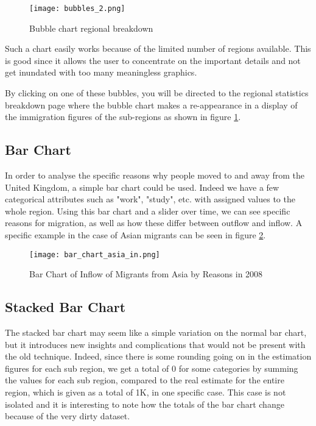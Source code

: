 \documentclass[11pt,a4paper,titlepage]{article}
\begin{document}
\begin{figure}[ht]
	\caption{Bubble chart regional breakdown}\label{fig_2}
	\centering
	\texttt{[image: bubbles\_2.png]}
\end{figure}

Such a chart easily works because of the limited number of regions available. This is good since it allows the user to concentrate on the important details and not get inundated with too many meaningless graphics.

By clicking on one of these bubbles, you will be directed to the regional statistics breakdown page where the bubble chart makes a re-appearance in a display of the immigration figures of the sub-regions as shown in figure \ref{fig_2}.

\subsection{Bar Chart}
In order to analyse the specific reasons why people moved to and away from the United Kingdom, a simple bar chart could be used. Indeed we have a few categorical attributes such as "work", "study", etc. with assigned values to the whole region. Using this bar chart and a slider over time, we can see specific reasons for migration, as well as how these differ between outflow and inflow. A specific example in the case of Asian migrants can be seen in figure \ref{fig_3}.

\begin{figure}[ht]
	\caption{Bar Chart of Inflow of Migrants from Asia by Reasons in 2008}\label{fig_3}
	\centering
	\texttt{[image: bar\_chart\_asia\_in.png]}
\end{figure}

\subsection{Stacked Bar Chart}
The stacked bar chart may seem like a simple variation on the normal bar chart, but it introduces new insights and complications that would not be present with the old technique. Indeed, since there is some rounding going on in the estimation figures for each sub region, we get a total of 0 for some categories by summing the values for each sub region, compared to the real estimate for the entire region, which is given as a total of 1K, in one specific case. This case is not isolated and it is interesting to note how the totals of the bar chart change because of the very dirty dataset.
\end{document}
